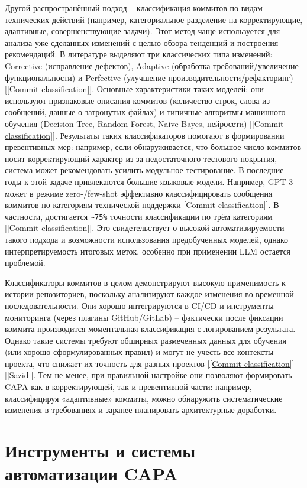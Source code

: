 Другой распространённый подход – классификация коммитов по видам технических действий (например, категориальное разделение на корректирующие, адаптивные, совершенствующие задачи). Этот метод чаще используется для анализа уже сделанных изменений с целью обзора тенденций и построения рекомендаций. В литературе выделяют три классических типа изменений: Corrective (исправление дефектов), Adaptive (обработка требований/увеличение функциональности) и Perfective (улучшение производительности/рефакторинг) [\ref{Commit-classification}]. Основные характеристики таких моделей: они используют признаковые описания коммитов (количество строк, слова из сообщений, данные о затронутых файлах) и типичные алгоритмы машинного обучения (Decision Tree, Random Forest, Naive Bayes, нейросети) [\ref{Commit-classification}]. Результаты таких классификаторов помогают в формировании превентивных мер: например, если обнаруживается, что большое число коммитов носит корректирующий характер из-за недостаточного тестового покрытия, система может рекомендовать усилить модульное тестирование. В последние годы к этой задаче привлекаются большие языковые модели. Например, GPT-3 может в режиме zero-/few-shot эффективно классифицировать сообщения коммитов по категориям технической поддержки \ref{Commit-classification}]. В частности, достигается \verb|~75%| точности классификации  по трём категориям [\ref{Commit-classification}].
Это свидетельствует о высокой автоматизируемости такого подхода и возможности использования предобученных моделей, однако интерпретируемость итоговых меток, особенно при применении LLM остается проблемой.

Классификаторы коммитов в целом демонстрируют высокую применимость к истории репозиториев, поскольку анализируют каждое изменения во временной последовательности. Они хорошо интегрируются в CI/CD и инструменты мониторинга (через плагины GitHub/GitLab) – фактически после фиксации коммита производится моментальная классификация с логированием результата. Однако такие системы требуют обширных размеченных данных для обучения (или хорошо сформулированных правил) и могут не учесть все контексты проекта, что снижает их точность для разных проектов [\ref{Commit-classification}][\ref{Sazid}]. Тем не менее, при правильной настройке они позволяют формировать CAPA как в корректирующей, так и превентивной части: например, классифицируя «адаптивные» коммиты, можно обнаружить систематические изменения в требованиях и заранее планировать архитектурные доработки.

\section{Инструменты и системы автоматизации CAPA} \label{ch1:sec4}

